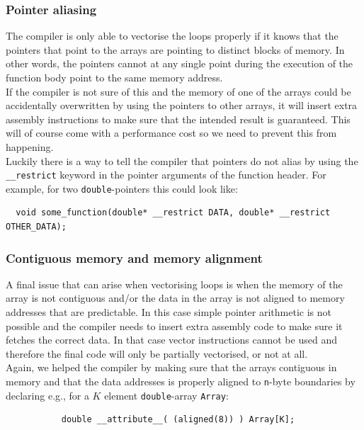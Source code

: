 \documentclass[11pt]{article}
\numberwithin{figure}{section}
\numberwithin{table}{section}
\begin{document}
      \subsubsection{Pointer aliasing}
        The compiler is only able to vectorise the loops properly if it knows that the pointers that point to the  arrays are pointing to distinct blocks of memory. In other words, the pointers cannot at any single point during the execution of the function body point to the same memory address. \\
      
        If the compiler is not sure of this and the memory of one of the arrays could be accidentally overwritten by using the pointers to other arrays, it will insert extra assembly instructions to make sure that the intended result is guaranteed. This will of course come with a performance cost so we need to prevent this from happening.\\
      
        Luckily there is a way to tell the compiler that pointers do not alias by using the \texttt{\_\_restrict} keyword in the pointer arguments of the function header. For example, for two \texttt{double}-pointers this could look like:
      \begin{verbatim}
  void some_function(double* __restrict DATA, double* __restrict OTHER_DATA);
      \end{verbatim}

      \subsubsection{Contiguous memory and memory alignment}
        A final issue that can arise when vectorising loops is when the memory of the array is not contiguous and/or the data in the array is not aligned to memory addresses that are predictable. In this case simple pointer arithmetic is not possible and the compiler needs to insert extra assembly code to make sure it fetches the correct data. In that case vector instructions cannot be used and therefore the final code will only be partially vectorised, or not at all.\\
        
        Again, we helped the compiler by making sure that the arrays contiguous in memory and that the data addresses is properly aligned to \texttt{n}-byte boundaries by declaring e.g., for a $K$ element \texttt{double}-array \texttt{Array}:
        \begin{verbatim}
           double __attribute__( (aligned(8)) ) Array[K];
        \end{verbatim}
      	 
\end{document}
